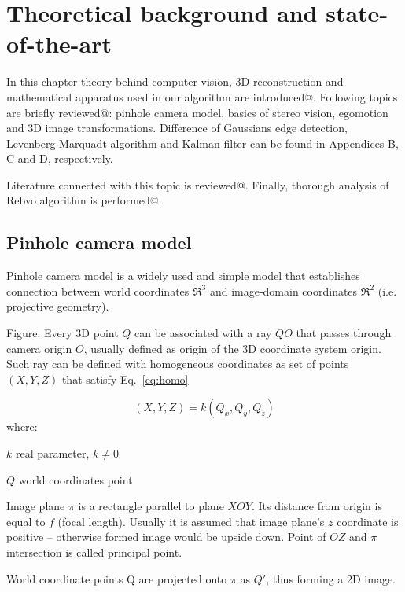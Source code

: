 \chapter{Theoretical background and state-of-the-art}
\label{cha:intro}


In this chapter theory behind computer vision, 3D reconstruction and mathematical apparatus used in our algorithm are introduced@. Following topics are briefly reviewed@: pinhole camera model, basics of stereo vision, egomotion and 3D image transformations. Difference of Gaussians edge detection, Levenberg-Marquadt algorithm and Kalman filter can be found in Appendices B, C and D, respectively.

Literature connected with this topic is reviewed@. Finally, thorough analysis of Rebvo algorithm \cite{jose2015realtime} is performed@.


\section{Pinhole camera model}
\label{sec:pinhole}


Pinhole camera model is a widely used and simple model that establishes connection between world coordinates $\Re^3$ and image-domain coordinates $\Re^2$ \cite{hartley2003multiple} (i.e. projective geometry).

Figure. Every 3D point $Q$ can be associated with a ray $QO$ that passes through camera origin $O$, usually defined as origin of the 3D coordinate system origin. Such ray can be defined with homogeneous coordinates as set of points $(X, Y, Z)$ that satisfy Eq.~\ref{eq:homo}

\begin{equation}
(X, Y, Z) = k(Q_x, Q_y, Q_z)
\label{eq:homo}
\end{equation}
where:
\begin{eqwhere}[2cm]
	\item[$k$] real parameter, \(k \neq 0\)
	\item[$Q$] world coordinates point
\end{eqwhere}

Image plane \(\pi\) is a rectangle parallel to plane \(XOY\). Its distance from origin is equal to \(f\) (focal length). Usually it is assumed that image plane's \(z\) coordinate is positive -- otherwise formed image would be upside down. Point of \(OZ\) and \(\pi\) intersection is called principal point.

World coordinate points Q are projected onto \(\pi\) as \(Q'\), thus forming a 2D image.

